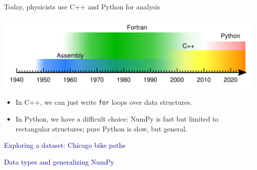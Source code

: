 \documentclass[aspectratio=169]{beamer}
\begin{document}
\begin{frame}{Today, physicists use C++ and Python for analysis}
\large
\vspace{0.25 cm}

\includegraphics[width=\linewidth]{img/programming-languages.pdf}

\vspace{0.2 cm}
\begin{itemize}\setlength{\itemsep}{0.2 cm}
\item<2-> In C++, we can just write \texttt{for} loops over data structures.
\item<3-> In Python, we have a difficult choice: NumPy is fast but limited to rectangular structures; pure Python is slow, but general.
\end{itemize}

\vspace{0.2 cm}
\Large
\begin{center}
\begin{minipage}{0.85\linewidth}
\begin{center}
\end{center}
\end{minipage}
\end{center}
\end{frame}

\begin{frame}{}
\Huge
\vspace{1 cm}
\begin{center}
\textcolor{darkblue}{Exploring a dataset: Chicago bike paths}
\end{center}
\end{frame}

\begin{frame}{}
\Huge
\vspace{1 cm}
\begin{center}
\textcolor{darkblue}{Data types and generalizing NumPy}
\end{center}
\end{frame}
\end{document}
